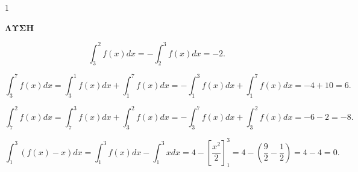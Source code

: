 \begin{ylh}{1}
    \item [Ύλη από εικόνα]
\end{ylh}
\textbf{ΛΥΣΗ}
\begin{alist}
\item \[ \int_3^2 f(x)dx = -\int_2^3 f(x)dx = -2. \]
\item \[ \int_3^7 f(x)dx = \int_3^1 f(x)dx + \int_1^7 f(x)dx = -\int_1^3 f(x)dx + \int_1^7 f(x)dx = -4+10=6. \]
\item \[ \int_7^2 f(x)dx = \int_7^3 f(x)dx + \int_3^2 f(x)dx = -\int_3^7 f(x)dx + \int_3^2 f(x)dx = -6-2 = -8. \]
\item \[ \int_1^3 (f(x)-x)dx = \int_1^3 f(x)dx - \int_1^3 xdx = 4 - \left[\frac{x^2}{2}\right]_1^3 = 4 - \left(\frac{9}{2} - \frac{1}{2}\right) = 4-4=0. \]
\end{alist}